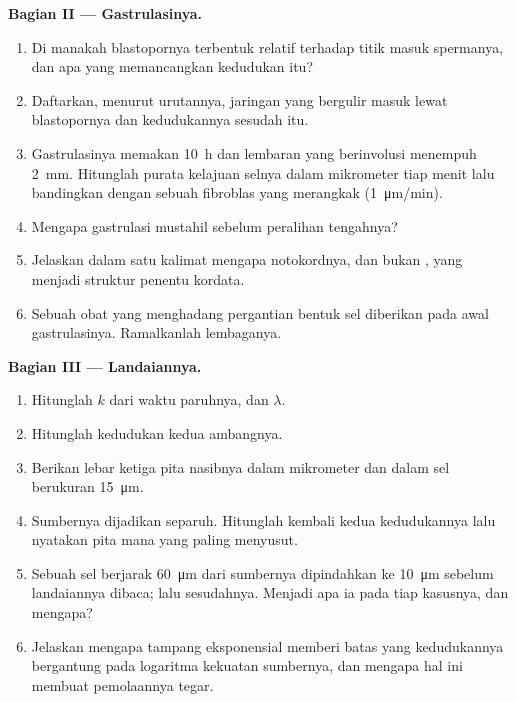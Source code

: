 \begin{problem}
\medskip
\noindent\textbf{Bagian II --- Gastrulasinya.}
\begin{enumerate}[resume]
  \item Di manakah blastopornya terbentuk relatif terhadap titik masuk
        spermanya, dan apa yang memancangkan kedudukan itu?
  \item Daftarkan, menurut urutannya, jaringan yang bergulir masuk
        lewat blastopornya dan kedudukannya sesudah itu.
  \item Gastrulasinya memakan \qty{10}{h} dan lembaran yang berinvolusi
        menempuh \qty{2}{mm}. Hitunglah purata kelajuan selnya dalam
        mikrometer tiap menit lalu bandingkan dengan sebuah fibroblas
        yang merangkak (\qty{1}{\micro m/min}).
  \item Mengapa gastrulasi mustahil sebelum peralihan 
        tengahnya?
  \item Jelaskan dalam satu kalimat mengapa notokordnya, dan bukan
        , yang menjadi struktur penentu kordata.
  \item Sebuah obat yang menghadang pergantian bentuk sel diberikan
        pada awal gastrulasinya. Ramalkanlah lembaganya.
\end{enumerate}

\medskip
\noindent\textbf{Bagian III --- Landaiannya.}
\begin{enumerate}[resume]
  \item Hitunglah $k$ dari waktu paruhnya, dan $\lambda$.
  \item Hitunglah kedudukan kedua ambangnya.
  \item Berikan lebar ketiga pita nasibnya dalam mikrometer dan dalam
        sel berukuran \qty{15}{\micro m}.
  \item Sumbernya dijadikan separuh. Hitunglah kembali kedua
        kedudukannya lalu nyatakan pita mana yang paling menyusut.
  \item Sebuah sel berjarak \qty{60}{\micro m} dari sumbernya
        dipindahkan ke \qty{10}{\micro m} sebelum landaiannya dibaca;
        lalu sesudahnya. Menjadi apa ia pada tiap kasusnya, dan mengapa?
  \item Jelaskan mengapa tampang eksponensial memberi batas yang
        kedudukannya bergantung pada logaritma kekuatan sumbernya, dan
        mengapa hal ini membuat pemolaannya tegar.
\end{enumerate}


\end{problem}
